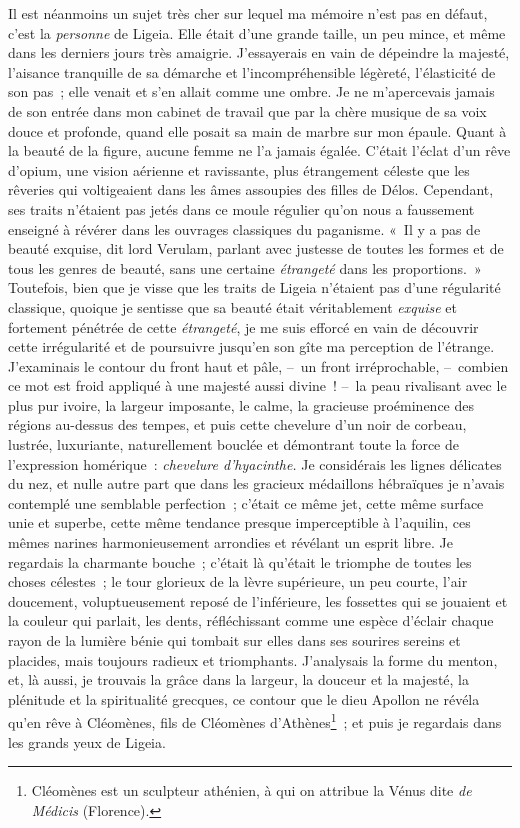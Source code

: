 \documentclass[french,twoside]{book} %
\begin{document}
Il est néanmoins un sujet très cher sur lequel ma mémoire n’est pas en défaut, c’est la \emph{personne} de Ligeia. Elle était d’une grande taille, un peu mince, et même dans les derniers jours très amaigrie. J’essayerais en vain de dépeindre la majesté, l’aisance tranquille de sa démarche et l’incompréhensible légèreté, l’élasticité de son pas ; elle venait et s’en allait comme une ombre. Je ne m’apercevais jamais de son entrée dans mon cabinet de travail que par la chère musique de sa voix douce et profonde, quand elle posait sa main de marbre sur mon épaule. Quant à la beauté de la figure, aucune femme ne l’a jamais égalée. C’était l’éclat d’un rêve d’opium, une vision aérienne et ravissante, plus étrangement céleste que les rêveries qui voltigeaient dans les âmes assoupies des filles de Délos. Cependant, ses traits n’étaient pas jetés dans ce moule régulier qu’on nous a faussement enseigné à révérer dans les ouvrages classiques du paganisme. « Il y a pas de beauté exquise, dit lord Verulam, parlant avec justesse de toutes les formes et de tous les genres de beauté, sans une certaine \emph{étrangeté} dans les proportions. » Toutefois, bien que je visse que les traits de Ligeia n’étaient pas d’une régularité classique, quoique je sentisse que sa beauté était véritablement \emph{exquise} et fortement pénétrée de cette \emph{étrangeté}, je me suis efforcé en vain de découvrir cette irrégularité et de poursuivre jusqu’en son gîte ma perception de l’étrange. J’examinais le contour du front haut et pâle, – un front irréprochable, – combien ce mot est froid appliqué à une majesté aussi divine ! – la peau rivalisant avec le plus pur ivoire, la largeur imposante, le calme, la gracieuse proéminence des régions au-dessus des tempes, et puis cette chevelure d’un noir de corbeau, lustrée, luxuriante, naturellement bouclée et démontrant toute la force de l’expression homérique : \emph{chevelure d’hyacinthe.} Je considérais les lignes délicates du nez, et nulle autre part que dans les gracieux médaillons hébraïques je n’avais contemplé une semblable perfection ; c’était ce même jet, cette même surface unie et superbe, cette même tendance presque imperceptible à l’aquilin, ces mêmes narines harmonieusement arrondies et révélant un esprit libre. Je regardais la charmante bouche ; c’était là qu’était le triomphe de toutes les choses célestes ; le tour glorieux de la lèvre supérieure, un peu courte, l’air doucement, voluptueusement reposé de l’inférieure, les fossettes qui se jouaient et la couleur qui parlait, les dents, réfléchissant comme une espèce d’éclair chaque rayon de la lumière bénie qui tombait sur elles dans ses sourires sereins et placides, mais toujours radieux et triomphants. J’analysais la forme du menton, et, là aussi, je trouvais la grâce dans la largeur, la douceur et la majesté, la plénitude et la spiritualité grecques, ce contour que le dieu Apollon ne révéla qu’en rêve à Cléomènes, fils de Cléomènes d’Athènes\footnote{Cléomènes est un sculpteur athénien, à qui on attribue la Vénus dite \emph{de Médicis} (Florence).} ; et puis je regardais dans les grands yeux de Ligeia.\par
\end{document}
